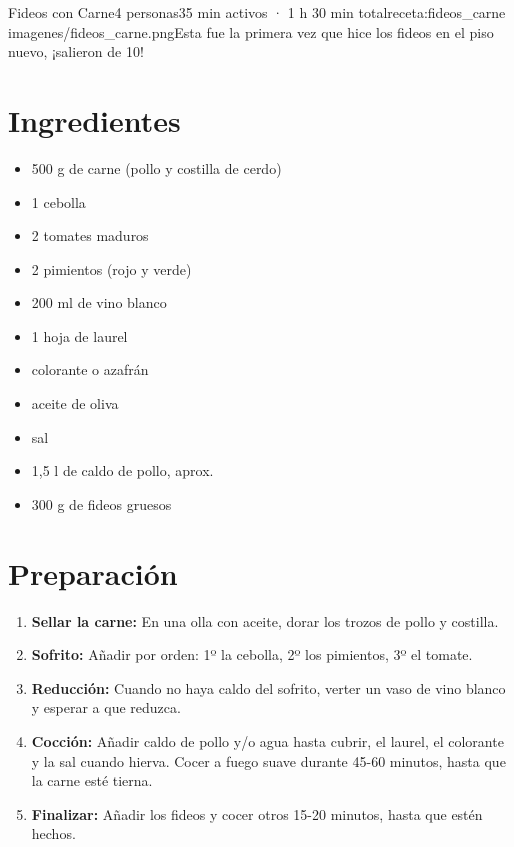 \begin{recetaConImagen}{Fideos con Carne}{4 personas}{35 min activos · 1 h 30 min total}{receta:fideos_carne}
    {imagenes/fideos_carne.png}{Esta fue la primera vez que hice los fideos en el piso nuevo, ¡salieron de 10!}


    \begin{minipage}[t]{0.35\textwidth}
        \section*{Ingredientes}
        \begin{itemize}[leftmargin=*]
            \item 500 g de carne (pollo y costilla de cerdo)
            \item 1 cebolla
            \item 2 tomates maduros
            \item 2 pimientos (rojo y verde)
            \item 200 ml de vino blanco
            \item 1 hoja de laurel
            \item colorante o azafrán
            \item aceite de oliva
            \item sal
            \item 1,5 l de caldo de pollo, aprox.
            \item 300 g de fideos gruesos
        \end{itemize}
    \end{minipage}
    \hfill
    \begin{minipage}[t]{0.6\textwidth}
        \section*{Preparación}
        \begin{enumerate}
            \item \textbf{Sellar la carne:} En una olla con aceite, dorar los trozos de pollo y costilla. 
            \item \textbf{Sofrito:} Añadir por orden: 1º la cebolla, 2º los pimientos, 3º el tomate. 
            \item \textbf{Reducción:} Cuando no haya caldo del sofrito, verter un vaso de vino blanco y esperar a que reduzca. 
            \item \textbf{Cocción:} Añadir caldo de pollo y/o agua hasta cubrir, el laurel, el colorante y la sal cuando hierva. Cocer a fuego suave durante 45-60 minutos, hasta que la carne esté tierna.
            \item \textbf{Finalizar:} Añadir los fideos y cocer otros 15-20 minutos, hasta que estén hechos.
        \end{enumerate}
    \end{minipage}


\end{recetaConImagen}
